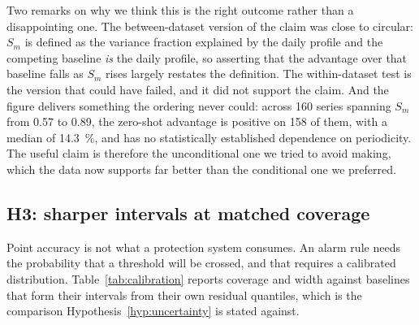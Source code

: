 \documentclass[utf8]{FrontiersinHarvard}
\newif\ifsecondrevisionmarkup
\newcommand{\rev}[1]{\ifsecondrevisionmarkup\textcolor{revisiontwo}{#1}\else#1\fi}
\theoremstyle{plain}
\theoremstyle{definition}
\theoremstyle{remark}
\begin{document}
Two remarks on why we think this is the right outcome rather than a disappointing one. The between-dataset version of the claim was close to circular: $S_m$ is defined as the variance fraction explained by the daily profile and the competing baseline \emph{is} the daily profile, so asserting that the advantage over that baseline falls as $S_m$ rises largely restates the definition. The within-dataset test is the version that could have failed, and it \rev{did not support the claim}. And the figure delivers something the ordering never could: across \num{160} series spanning $S_m$ from \num{0.57} to \num{0.89}, the zero-shot advantage is positive on \num{158} of them, with a median of \SI{14.3}{\percent}, and has no \rev{statistically established} dependence on periodicity. The useful claim is therefore the unconditional one we tried to avoid making, which the data now supports far better than the conditional one we preferred.

\subsection{H3: sharper intervals at matched coverage}

Point accuracy is not what a protection system consumes. An alarm rule needs the probability that a threshold will be crossed, and that requires a calibrated distribution. Table~\ref{tab:calibration} reports coverage and width against baselines that form their intervals from their own residual quantiles, which is the comparison Hypothesis~\ref{hyp:uncertainty} is stated against.
\end{document}
